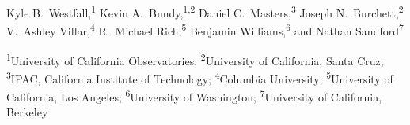 Kyle B.\ Westfall,\textsuperscript{1}
Kevin A.\ Bundy,\textsuperscript{1,2}
Daniel C.\ Masters,\textsuperscript{3}
Joseph N.\ Burchett,\textsuperscript{2}
V.\ Ashley Villar,\textsuperscript{4}
R.\ Michael Rich,\textsuperscript{5}
Benjamin Williams,\textsuperscript{6}
and
Nathan Sandford\textsuperscript{7}

\begin{small}
\textsuperscript{1}University of California Observatories;
\textsuperscript{2}University of California, Santa Cruz;
\textsuperscript{3}IPAC, California Institute of Technology;
\textsuperscript{4}Columbia University;
\textsuperscript{5}University of California, Los Angeles;
\textsuperscript{6}University of Washington;
\textsuperscript{7}University of California, Berkeley
\end{small}

